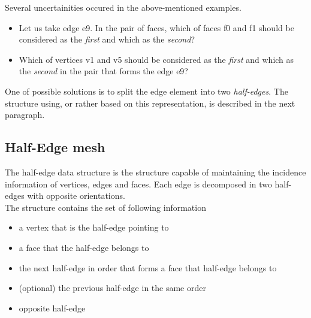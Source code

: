 Several uncertainities occured in the above-mentioned examples.

\begin{itemize}
\item Let us take edge \textsf{e9}. In the pair of faces, which of faces \textsf{f0} and 
\textsf{f1} should be considered as the \emph{first} and which as the \emph{second}?

\item Which of vertices \textsf{v1} and \textsf{v5} should be considered as 
the \emph{first} and which as the \emph{second} in the pair that forms the edge \textsf{e9}?
\end{itemize}

One of possible solutions is to split the edge element into two \emph{half-edges}.
The structure using, or rather based on this representation, is described in the next
paragraph.

\subsection{Half-Edge mesh}

The half-edge data structure is the structure capable of maintaining the incidence
information of vertices, edges and faces\cite{Botsch2006}. Each edge is decomposed in two half-edges
with opposite orientations.
\\

The structure contains the set of following information
\begin{itemize}
\item a vertex that is the half-edge pointing to
\item a face that the half-edge belongs to
\item the next half-edge in order that forms a face that half-edge belongs to
\item (optional) the previous half-edge in the same order
\item opposite half-edge
\end{itemize}

